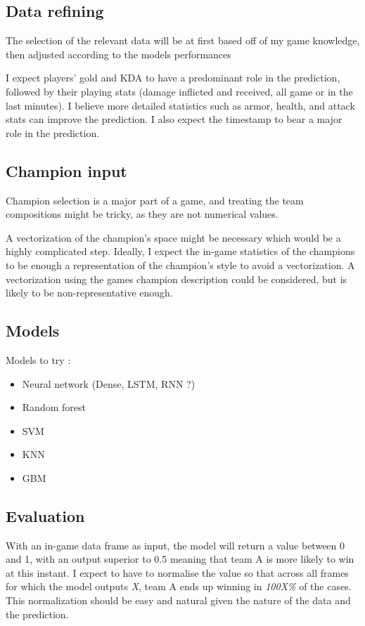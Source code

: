 \documentclass{article}
\begin{document}
\subsection{Data refining}
The selection of the relevant data will be at first based off of my game knowledge, then adjusted according to the models performances

I expect players' gold and KDA to have a predominant role in the prediction, followed by their playing stats (damage inflicted and received, all game or in the last minutes). I believe more detailed statistics such as armor, health, and attack stats can improve the prediction. I also expect the timestamp to bear a major role in the prediction.

\subsection{Champion input}

Champion selection is a major part of a game, and treating the team compositions might be tricky, as they are not numerical values.

A vectorization of the champion's space might be necessary which would be a highly complicated step. Ideally, I expect the in-game statistics of the champions to be enough a representation of the champion's style to avoid a vectorization.
A vectorization using the games champion description could be considered, but is likely to be non-representative enough.

\subsection{Models}

Models to try :
\begin{itemize}
    \item Neural network (Dense, LSTM, RNN ?)
    \item Random forest
    \item SVM
    \item KNN
    \item GBM
\end{itemize}

\subsection{Evaluation}
With an in-game data frame as input, the model will return a value between 0 and 1, with an output superior to 0.5 meaning that team A is more likely to win at this instant. I expect to have to normalise the value so that across all frames for which the model outputs \textit{X}, team A ends up winning in \textit{100X\%} of the cases. This normalization should be easy and natural given the nature of the data and the prediction.
\end{document}
